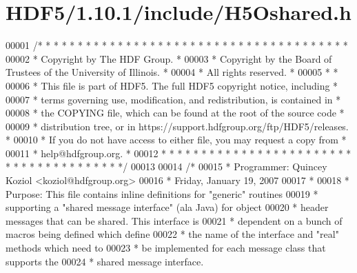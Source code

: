 \hypertarget{_h_d_f5_21_810_81_2include_2_h5_oshared_8h_source}{}\section{H\+D\+F5/1.10.1/include/\+H5\+Oshared.h}
\label{_h_d_f5_21_810_81_2include_2_h5_oshared_8h_source}

\begin{DoxyCode}
00001 \textcolor{comment}{/* * * * * * * * * * * * * * * * * * * * * * * * * * * * * * * * * * * * * * *}
00002 \textcolor{comment}{ * Copyright by The HDF Group.                                               *}
00003 \textcolor{comment}{ * Copyright by the Board of Trustees of the University of Illinois.         *}
00004 \textcolor{comment}{ * All rights reserved.                                                      *}
00005 \textcolor{comment}{ *                                                                           *}
00006 \textcolor{comment}{ * This file is part of HDF5.  The full HDF5 copyright notice, including     *}
00007 \textcolor{comment}{ * terms governing use, modification, and redistribution, is contained in    *}
00008 \textcolor{comment}{ * the COPYING file, which can be found at the root of the source code       *}
00009 \textcolor{comment}{ * distribution tree, or in https://support.hdfgroup.org/ftp/HDF5/releases.  *}
00010 \textcolor{comment}{ * If you do not have access to either file, you may request a copy from     *}
00011 \textcolor{comment}{ * help@hdfgroup.org.                                                        *}
00012 \textcolor{comment}{ * * * * * * * * * * * * * * * * * * * * * * * * * * * * * * * * * * * * * * */}
00013 
00014 \textcolor{comment}{/*}
00015 \textcolor{comment}{ * Programmer:  Quincey Koziol <koziol@hdfgroup.org>}
00016 \textcolor{comment}{ *      Friday, January 19, 2007}
00017 \textcolor{comment}{ *}
00018 \textcolor{comment}{ * Purpose: This file contains inline definitions for "generic" routines}
00019 \textcolor{comment}{ *      supporting a "shared message interface" (ala Java) for object}
00020 \textcolor{comment}{ *      header messages that can be shared.  This interface is}
00021 \textcolor{comment}{ *              dependent on a bunch of macros being defined which define}
00022 \textcolor{comment}{ *              the name of the interface and "real" methods which need to}
00023 \textcolor{comment}{ *              be implemented for each message class that supports the}
00024 \textcolor{comment}{ *              shared message interface.}

\end{DoxyCode}

